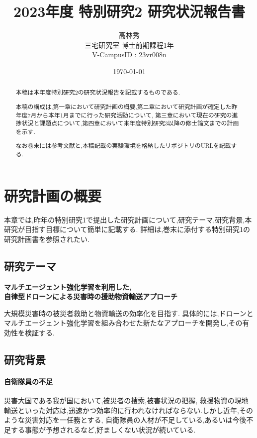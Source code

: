 \documentclass{article}[jsarticle]
\title{2023年度 特別研究2 研究状況報告書}
\author{高林秀 \\ 三宅研究室 博士前期課程1年 \\ V-CampusID : 23vr008n}
\date{\today}
\begin{document}
\maketitle

\begin{abstract}
    本稿は本年度特別研究2の研究状況報告を記載するものである.\par
    本稿の構成は,第一章において研究計画の概要,第二章において研究計画が確定した昨年度7月から本年1月までに行った研究活動について,
    第三章において現在の研究の進捗状況と課題点について,第四章において来年度特別研究3以降の修士論文までの計画を示す.\par 
    なお巻末には参考文献と,本稿記載の実験環境を格納したリポジトリのURLを記載する.
\end{abstract}



\tableofcontents


\section{研究計画の概要}
本章では,昨年の特別研究1で提出した研究計画について,研究テーマ,研究背景,本研究が目指す目標について簡単に記載する.
詳細は,巻末に添付する特別研究1の研究計画書を参照されたい.
\subsection{研究テーマ}
    \centerline{
        \textbf{マルチエージェント強化学習を利用した,} \\
        \textbf{自律型ドローンによる災害時の援助物資輸送アプローチ}
    }

    大規模災害時の被災者救助と物資輸送の効率化を目指す.
    具体的には,ドローンとマルチエージェント強化学習を組み合わせた新たなアプローチを開発し,その有効性を検証する.
\subsection{研究背景}
\paragraph{自衛隊員の不足} \par 
災害大国である我が国において,被災者の捜索,被害状況の把握,
救援物資の現地輸送といった対応は,迅速かつ効率的に行われなければならない.しかし近年,そのような災害対応を一任務とする,
自衛隊員の人材が不足している,あるいは今後不足する事態が予想されるなど,好ましくない状況が続いている.
\end{document}
